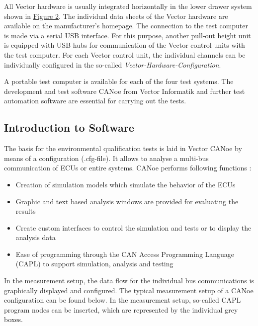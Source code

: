 All Vector hardware is usually integrated horizontally in the lower drawer system shown in \hyperref[fig:Testrack]{Figure 2}. The individual data sheets of the Vector hardware are available on the manufacturer's homepage. The connection to the test computer is made via a serial USB interface. For this purpose, another pull-out height unit is equipped with USB hubs for communication of the Vector control units with the test computer. For each Vector control unit, the individual channels can be individually configured in the so-called \emph{Vector-Hardware-Configuration}.

A portable test computer is available for each of the four test systems. The development and test software CANoe from Vector Informatik and further test automation software are essential for carrying out the tests. 

%
%
\newpage

\subsection{Introduction to Software}

The basis for the environmental qualification tests is laid in Vector CANoe by means of a configuration (.cfg-file). It allows to analyse a multi-bus communication of ECUs or entire systems.
CANoe performs following functions \cite{pd} : 
\begin{itemize}
    \item Creation of simulation models which simulate the behavior of the ECUs
    \item Graphic and text based analysis windows are provided for evaluating the results
    \item Create custom interfaces to control the simulation and tests or to display the analysis data
    \item Ease of programming through the CAN Access Programming Language (CAPL) to support simulation, analysis and testing
\end{itemize}

In the measurement setup, the data flow for the individual bus communications is graphically displayed and configured. The typical measurement setup of a CANoe configuration can be found below. In the measurement setup, so-called CAPL program nodes can be inserted, which are represented by the individual grey boxes. 


